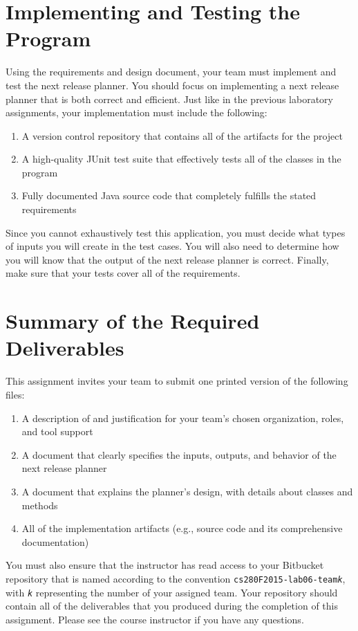 \section*{Implementing and Testing the Program}

Using the requirements and design document, your team must implement and test the next release planner. You should focus on
implementing a next release planner that is both correct and efficient. Just like in the previous laboratory assignments,
your implementation must include the following:

\vspace*{-.1in}
\begin{enumerate}
\itemsep0em
    \item A version control repository that contains all of the artifacts for the project
    \item A high-quality JUnit test suite that effectively tests all of the classes in the program
    \item Fully documented Java source code that completely fulfills the stated requirements
\end{enumerate}
\vspace*{-.1in}

Since you cannot exhaustively test this application, you must decide what types of inputs you will create in the test
cases.  You will also need to determine how you will know that the output of the next release planner is correct.
Finally, make sure that your tests cover all of the requirements.

\section*{Summary of the Required Deliverables}

This assignment invites your team to submit one printed version of the following files:
\vspace*{-.1in}
\begin{enumerate}
    \itemsep0em
    \item A description of and justification for your team's chosen organization, roles, and tool support
    \item A document that clearly specifies the inputs, outputs, and behavior of the next release planner
    \item A document that explains the planner's design, with details about classes and methods
    \item All of the implementation artifacts (e.g., source code and its comprehensive documentation)
\end{enumerate}
\vspace*{-.1in}

You must also ensure that the instructor has read access to your Bitbucket repository that is named according to the
convention {\tt cs280F2015-lab06-team{\em k}}, with {\tt {\em k}} representing the number of your assigned team.  Your
repository should contain all of the deliverables that you produced during the completion of this assignment.  Please
see the course instructor if you have any questions.


